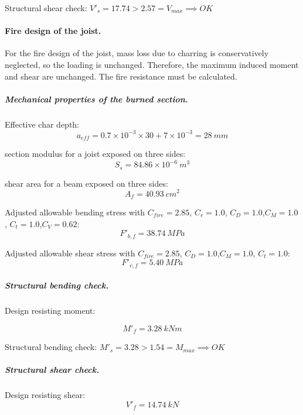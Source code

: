 \noindent Structural shear check: $V'_s = 17.74 > 2.57 = V_{max} \implies OK$

\paragraph{Fire design of the joist.}
For the fire design of the joist, mass loss due to charring is conservatively neglected, so the loading is unchanged. Therefore, the maximum induced moment and shear are unchanged. The fire resistance must be calculated.

\subparagraph{Mechanical properties of the burned section.}

\noindent Effective char depth:
\begin{equation}
  a_{eff}= 0.7 \times 10^{-3} \times 30 + 7 \times 10^{-3}= 28\ mm
\end{equation}

\noindent section modulus for a joist exposed on three sides:
\begin{equation}
  S_s= 84.86 \times 10^{-6}\ m^3
\end{equation}

\noindent shear area for a beam exposed on three sides:
\begin{equation}
  A_f= 40.93\ cm^2
\end{equation}

\noindent Adjusted allowable bending stress with $C_{fire}= 2.85$, $C_r= 1.0$, $C_D= 1.0$,$C_M= 1.0$, $C_t= 1.0$,$C_V= 0.62$:
\begin{equation}
  F'_{b,f}= 38.74\ MPa
\end{equation}

\noindent Adjusted allowable shear stress with  $C_{fire}= 2.85$, $C_D= 1.0$,$C_M= 1.0$, $C_t= 1.0$:
\begin{equation}
  F'_{v,f}= 5.40\ MPa
\end{equation}

\subparagraph{Structural bending check.}

\noindent Design resisting moment:

\begin{equation}
  M'_f= 3.28\ kN m
\end{equation}

\noindent Structural bending check: $M'_s = 3.28 > 1.54 = M_{max} \implies OK$

\subparagraph{Structural shear check.}

\noindent Design resisting shear:
\begin{equation}
  V'_f= 14.74\ kN
\end{equation}

